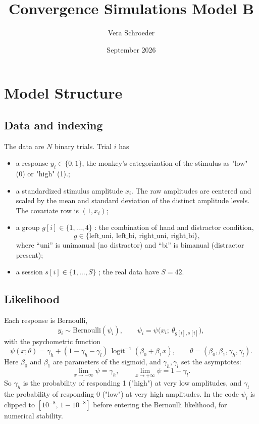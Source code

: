 \documentclass[11pt]{article}
\title{Convergence Simulations Model B}
\author{Vera Schroeder}
\date{September 2026}
\newcommand{\invlogit}{\operatorname{logit}^{-1}}
\begin{document}
\maketitle


\section{Model Structure}
\subsection{Data and indexing}
The data are $N$ binary trials. Trial $i$ has
\begin{itemize}
  \item a response $y_i \in \{0,1\}$, the monkey's categorization of the stimulus as "low" (0) or "high" (1).;
  \item a standardized stimulus amplitude $x_i$. The raw amplitudes are centered and scaled by the mean and standard deviation of the distinct amplitude levels. The covariate row is
        $(1, x_i)$;
  \item a group $g[i] \in \{1,\dots,4\}$ : the combination of
        hand and distractor condition,
        \[
          g \in \{\text{left\_uni},\ \text{left\_bi},\ \text{right\_uni},\ \text{right\_bi}\},
        \]
        where ``uni'' is unimanual (no distractor) and ``bi'' is bimanual
        (distractor present);
  \item a session $s[i] \in \{1,\dots,S\}$ ; the real data have
        $S = 42$.
\end{itemize}

\subsection{Likelihood}


Each response is Bernoulli,
\[
  y_i \sim \text{Bernoulli}(\psi_i), \qquad
  \psi_i = \psi\big(x_i;\ \theta_{g[i],s[i]}\big),
\]
with the psychometric function
\[
  \psi(x;\theta) = \gamma_h + (1 - \gamma_h - \gamma_l)\,\invlogit(\beta_0 + \beta_1 x),
  \qquad \theta = (\beta_0, \beta_1, \gamma_h, \gamma_l).
\]
Here $\beta_0$ and $\beta_1$ are parameters of the sigmoid, and $\gamma_h,\gamma_l$
set the asymptotes:
\[
  \lim_{x\to-\infty}\psi = \gamma_h, \qquad \lim_{x\to+\infty}\psi = 1-\gamma_l .
\]
So $\gamma_h$ is the probability of responding 1 ("high") at very low amplitudes, and
$\gamma_l$ the probability of responding 0 ("low") at very high amplitudes. In the code
$\psi_i$ is clipped to $[10^{-8},\,1-10^{-8}]$ before entering the Bernoulli
likelihood, for numerical stability.
\end{document}
